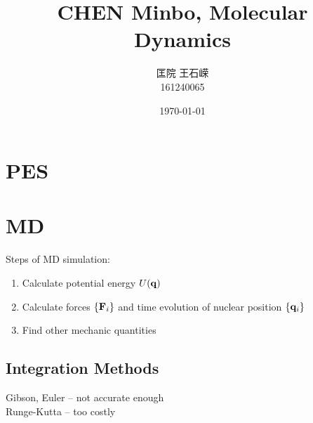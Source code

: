 \documentclass[UTF8]{ctexart} %
\title{CHEN Minbo, Molecular Dynamics}
\author{匡院 王石嵘\\
161240065}
\date{\today} %
\numberwithin{equation}{section}
\begin{document}
\maketitle

\tableofcontents

\newpage

\section{}

\section{PES}

\section{MD}

Steps of MD simulation:
\begin{enumerate}
	\item Calculate potential energy $ U(\vb{q}) $
	\item Calculate forces $ \{\vb{F}_i\} $ and time evolution of nuclear position $ \{\vb{q}_i\} $
	\item Find other mechanic quantities
\end{enumerate}

\subsection{Integration Methods}
Gibson, Euler -- not accurate enough\\
Runge-Kutta -- too costly\\
\end{document}
